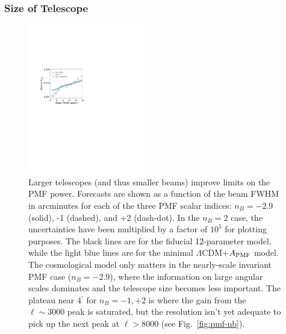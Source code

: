 \documentclass[apj]{emulateapj}
\newcommand{\apmf}{\ensuremath{A_{\rm PMF}}}
\newcommand{\lcdm}{\ensuremath{\Lambda}CDM}
\newcommand{\changed}[1]{\textcolor{Black}{#1}}
\begin{document}
\subsubsection{Size of Telescope }


\begin{figure}[htb]\centering
\includegraphics[width=0.45\textwidth,clip,trim={2.cm 12.5cm 11cm 7.5cm}]{pmf_beam.pdf}
  \caption[]{ \label{fig:beam}
 Larger telescopes (and thus smaller beams) improve limits on the PMF power. 
 Forecasts are shown as a function of the beam FWHM in arcminutes for each of the three PMF scalar indices: $n_B = -2.9$ (solid), -1 (dashed), and +2 (dash-dot). 
   In the $n_B=2$ case, the uncertainties have been multiplied by a factor of $10^5$ for plotting purposes. 
  The black lines are for the fiducial \changed{12}-parameter model, while the light blue lines are for the minimal \lcdm{}+\apmf{} model. 
  The cosmological model only matters in the nearly-scale invariant PMF case ($n_B=-2.9$), where the information on large angular scales dominates and the telescope size becomes less important. 
  The plateau near 4$^\prime$ for $n_B=-1, +2$ is where the gain from the $\ell\sim3000$ peak is saturated, but the resolution isn't yet adequate to pick up the next peak at $\ell > 8000$ (see  Fig.~\ref{fig:pmf-nb}).  
    }
\end{figure}
\end{document}

